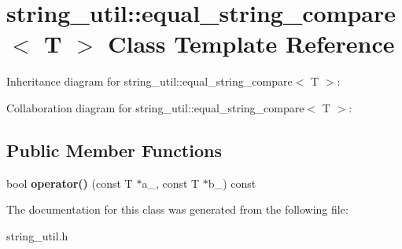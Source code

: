 \section{string\+\_\+util\+:\+:equal\+\_\+string\+\_\+compare$<$ T $>$ Class Template Reference}
\label{classstring__util_1_1equal__string__compare}


Inheritance diagram for string\+\_\+util\+:\+:equal\+\_\+string\+\_\+compare$<$ T $>$\+:


Collaboration diagram for string\+\_\+util\+:\+:equal\+\_\+string\+\_\+compare$<$ T $>$\+:
\subsection*{Public Member Functions}
\begin{DoxyCompactItemize}
\item 
bool {\bfseries operator()} (const T $\ast$a\+\_\+, const T $\ast$b\+\_\+) const \label{classstring__util_1_1equal__string__compare_aedfb40c0515b97043369af03da1d72ed}

\end{DoxyCompactItemize}


The documentation for this class was generated from the following file\+:\begin{DoxyCompactItemize}
\item 
string\+\_\+util.\+h\end{DoxyCompactItemize}
